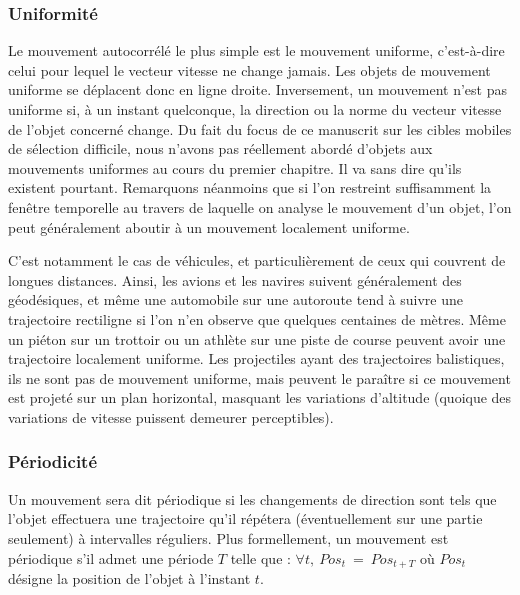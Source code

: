 	\FloatBarrier \subsubsection{Uniformité}
	Le mouvement autocorrélé le plus simple est le mouvement uniforme, c'est-à-dire celui pour lequel le vecteur vitesse ne change jamais. Les objets de mouvement uniforme se déplacent donc en ligne droite. Inversement, un mouvement n'est pas uniforme si, à un instant quelconque, la direction ou la norme du vecteur vitesse de l'objet concerné change. Du fait du focus de ce manuscrit sur les cibles mobiles de sélection difficile, nous n'avons pas réellement abordé d'objets aux mouvements uniformes au cours du premier chapitre. Il va sans dire qu'ils existent pourtant. Remarquons néanmoins que si l'on restreint suffisamment la fenêtre temporelle au travers de laquelle on analyse le mouvement d'un objet, l'on peut généralement aboutir à un mouvement localement uniforme.
	
	C'est notamment le cas de véhicules, et particulièrement de ceux qui couvrent de longues distances. Ainsi, les avions et les navires suivent généralement des géodésiques,\footnotemark{} et même une automobile sur une autoroute tend à suivre une trajectoire rectiligne si l'on n'en observe que quelques centaines de mètres. Même un piéton sur un trottoir ou un athlète sur une piste de course peuvent avoir une trajectoire localement uniforme. Les projectiles ayant des trajectoires balistiques, ils ne sont pas de mouvement uniforme, mais peuvent le paraître si ce mouvement est projeté sur un plan horizontal, masquant les variations d'altitude (quoique des variations de vitesse puissent demeurer perceptibles). %

	
	
	\FloatBarrier \subsubsection{Périodicité}
	Un mouvement sera dit périodique si les changements de direction sont tels que l'objet effectuera une trajectoire qu'il répétera (éventuellement sur une partie seulement) à intervalles réguliers. Plus formellement, un mouvement est périodique s'il admet une période $T$ telle que :	$\forall t,~Pos_{t}~=~Pos_{t+T}$ où $Pos_{t}$ désigne la position de l'objet à l'instant $t$.
	
